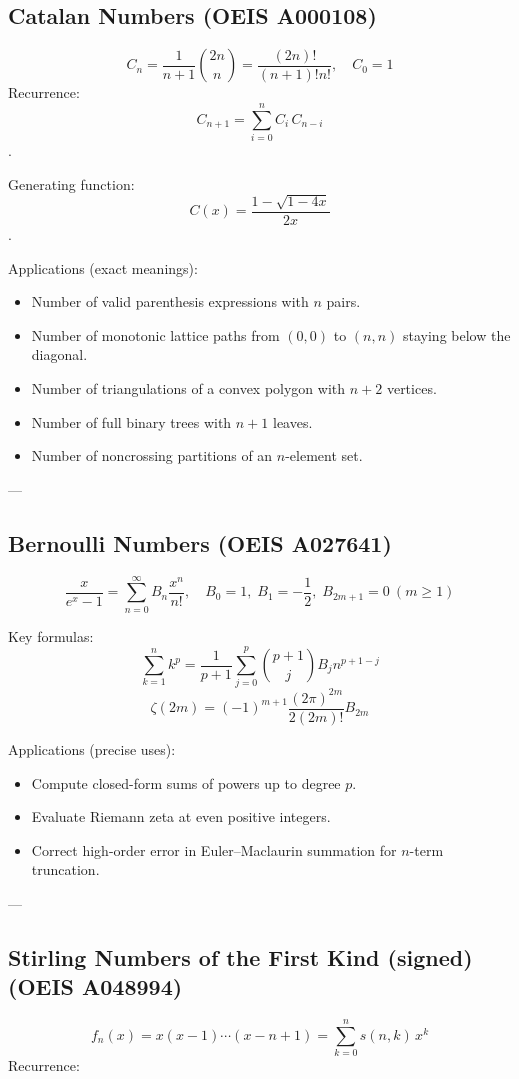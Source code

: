 \subsection*{Catalan Numbers (OEIS A000108)}
\[
C_n = \frac{1}{n+1}\binom{2n}{n} = \frac{(2n)!}{(n+1)!n!}, \quad C_0 = 1
\]
Recurrence: 
\[
C_{n+1} = \sum_{i=0}^{n} C_i\,C_{n-i}
\].  

Generating function: 
\[
C(x) = \frac{1 - \sqrt{1-4x}}{2x}
\].

Applications (exact meanings):
\begin{itemize}
  \item Number of valid parenthesis expressions with \(n\) pairs.
  \item Number of monotonic lattice paths from \((0,0)\) to \((n,n)\) staying below the diagonal.
  \item Number of triangulations of a convex polygon with \(n+2\) vertices.
  \item Number of full binary trees with \(n+1\) leaves.
  \item Number of noncrossing partitions of an \(n\)-element set.
\end{itemize}

---

\subsection*{Bernoulli Numbers (OEIS A027641)}
\[
\frac{x}{e^x - 1} = \sum_{n=0}^\infty B_n \frac{x^n}{n!}, \quad B_0 = 1,\; B_1 = -\frac{1}{2},\; B_{2m+1} = 0\ (m \ge 1)
\]

Key formulas:
\[
\sum_{k=1}^n k^p = \frac{1}{p+1} \sum_{j=0}^{p} \binom{p+1}{j} B_j n^{p+1-j}
\]
\[
\zeta(2m) = (-1)^{m+1} \frac{(2\pi)^{2m}}{2(2m)!} B_{2m}
\]

Applications (precise uses):
\begin{itemize}
  \item Compute closed-form sums of powers up to degree \(p\).
  \item Evaluate Riemann zeta at even positive integers.
  \item Correct high-order error in Euler–Maclaurin summation for \(n\)-term truncation.
\end{itemize}

---

\subsection*{Stirling Numbers of the First Kind (signed) (OEIS A048994)}
\[
f_n(x) = x(x-1)\cdots(x-n+1) = \sum_{k=0}^n s(n,k)\,x^k
\]
Recurrence: 


